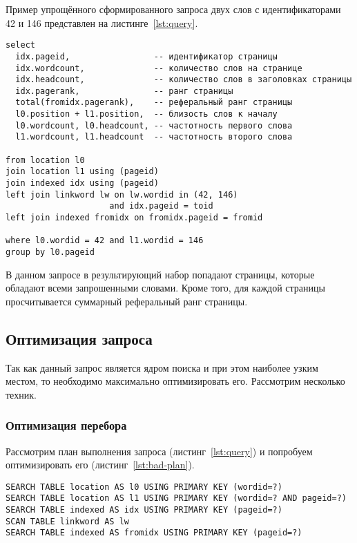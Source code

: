 Пример упрощённого сформированного запроса двух слов с идентификаторами 42 и 146 представлен на листинге~\ref{lst:query}.
\begin{lstlisting}[language=sqlite, caption=Запрос релевантных документов., label=lst:query]
select
  idx.pageid,                 -- идентификатор страницы
  idx.wordcount,              -- количество слов на странице
  idx.headcount,              -- количество слов в заголовках страницы
  idx.pagerank,               -- ранг страницы
  total(fromidx.pagerank),    -- реферальный ранг страницы
  l0.position + l1.position,  -- близость слов к началу
  l0.wordcount, l0.headcount, -- частотность первого слова
  l1.wordcount, l1.headcount  -- частотность второго слова

from location l0
join location l1 using (pageid)
join indexed idx using (pageid)
left join linkword lw on lw.wordid in (42, 146)
                     and idx.pageid = toid
left join indexed fromidx on fromidx.pageid = fromid

where l0.wordid = 42 and l1.wordid = 146
group by l0.pageid
\end{lstlisting}

В данном запросе в результирующий набор попадают страницы, которые обладают всеми запрошенными словами. Кроме того, для каждой страницы просчитывается суммарный реферальный ранг страницы.


\subsection{Оптимизация запроса}
Так как данный запрос является ядром поиска и при этом наиболее узким местом, то необходимо максимально оптимизировать его. Рассмотрим несколько техник.


\subsubsection{Оптимизация перебора} \label{sssec:optimization}
Рассмотрим план выполнения запроса (листинг~\ref{lst:query}) и попробуем оптимизировать его (листинг~\ref{lst:bad-plan}).
\begin{lstlisting}[language=sql-explain, caption=Неоптимальный план выполнения запроса., label=lst:bad-plan]
SEARCH TABLE location AS l0 USING PRIMARY KEY (wordid=?)
SEARCH TABLE location AS l1 USING PRIMARY KEY (wordid=? AND pageid=?)
SEARCH TABLE indexed AS idx USING PRIMARY KEY (pageid=?)
SCAN TABLE linkword AS lw
SEARCH TABLE indexed AS fromidx USING PRIMARY KEY (pageid=?)
\end{lstlisting}

